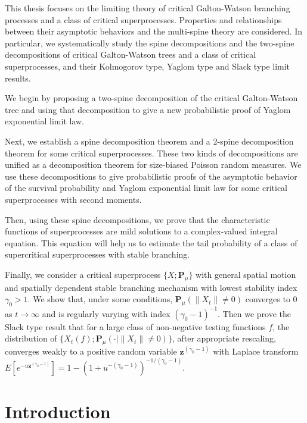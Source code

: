 \documentclass[UTF8]{pkuthss}
\theoremstyle{plain}
\theoremstyle{definition}
\numberwithin{equation}{section}
\begin{document}
\begin{eabstract}
	This thesis focuses on the limiting theory of critical Galton-Watson branching processes and a class of critical superprocesses.
	Properties and relationships between their asymptotic behaviors and the multi-spine theory are considered.
	In particular, we systematically study  the spine decompositions and the two-spine decompositions of critical Galton-Watson trees and a class of critical superprocesses, and their Kolmogorov type, Yaglom type and Slack type limit results. 

	We begin by proposing a two-spine decomposition of the critical Galton-Watson tree and using that decomposition to give a new probabilistic proof of Yaglom exponential limit law.
	
	Next, we establish a spine decomposition theorem and a 2-spine decomposition theorem for some critical superprocesses. These two kinds of decompositions are unified as a decomposition theorem for size-biased Poisson random measures. We use these decompositions to give probabilistic proofs of the asymptotic behavior of the survival probability and Yaglom exponential limit law for some critical superprocesses with second moments.

	Then, using these spine decompositions, we prove that the characteristic functions of superprocesses are mild solutions to a complex-valued integral equation. 
	This equation will help us to estimate the tail probability of a class of supercritical superprocesses with stable branching.

	Finally, we consider a critical superprocess $\{X;\mathbf P_\mu\}$ with general spatial motion and spatially dependent stable branching mechanism with lowest stability index $\gamma_0 > 1$. We show that, under some conditions, $\mathbf P_{\mu}(\|X_t\|\neq 0)$ converges to $0$ as $t\to \infty$ and is regularly varying with index $(\gamma_0-1)^{-1}$. 
	Then we prove the Slack type result that for a large class of non-negative testing functions $f$, the distribution of $\{X_t(f);\mathbf P_\mu(\cdot|\|X_t\|\neq 0)\}$, after appropriate rescaling, converges weakly to a positive random variable $\mathbf z^{(\gamma_0-1)}$ with Laplace transform $E[e^{-u\mathbf z^{(\gamma_0-1)}}]=1-(1+u^{-(\gamma_0-1)})^{-1/(\gamma_0-1)}.$
\end{eabstract}
	\tableofcontents
	\mainmatter
\chapter{Introduction}
\end{document}
